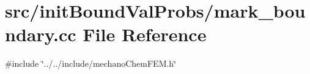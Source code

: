\section{src/init\+Bound\+Val\+Probs/mark\+\_\+boundary.cc File Reference}
\label{mark__boundary_8cc}
{\ttfamily \#include \char`\"{}../../include/mechano\+Chem\+F\+E\+M.\+h\char`\"{}}\newline

